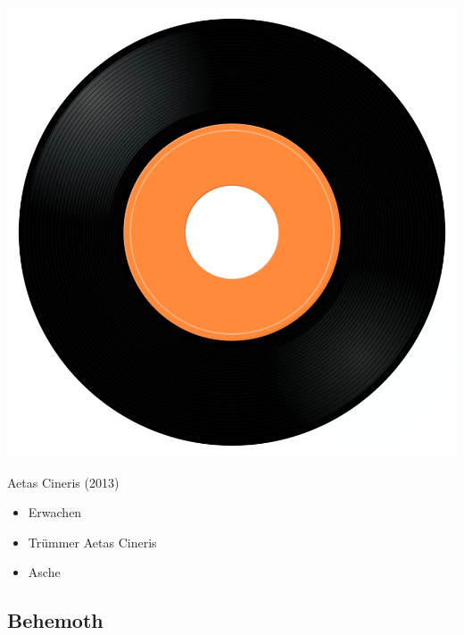 \begin{minipage}[t]{0.25\textwidth}
\captionsetup{type=figure}
\includegraphics[width=\textwidth]{Images/cover.png}
\caption*{Aetas Cineris (2013)}
\end{minipage}
\begin{minipage}[t]{0.25\textwidth}\vspace{0pt}
\begin{itemize}[nosep,leftmargin=1em,labelwidth=*,align=left]
	\setlength{\itemsep}{0pt}
	\item Erwachen
	\item Trümmer \/ Aetas Cineris
	\item Asche
\end{itemize}
\end{minipage}

\subsection{Behemoth}

